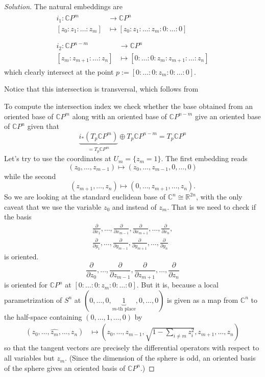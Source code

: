 \begin{proof}[Solution]\leavevmode
The natural embeddings are
\begin{align*}
\begin{aligned}i_1: \mathbb{C}P^m &\longrightarrow \mathbb{C}P^n \\
	[z_0:z_1:\ldots:z_m] &\longmapsto [z_0:z_1:\ldots:z_m:0:\ldots:0]
\end{aligned}
\\\\\begin{aligned}	i_2: \mathbb{C}P^{n-m} &\longrightarrow \mathbb{C}P^n \\
[z_{m}:z_{m+1}:\ldots:z_n] &\longmapsto [0:\ldots:0:z_{m}:z_{m+1}:\ldots:z_n] \end{aligned}\end{align*}
which clearly intersect at the point \(p:=[0:\ldots:0:z_m:0:\ldots:0]\).

Notice that this intersection is transversal, which follows from

To compute the intersection index we check whether the base obtained from an oriented base of \(\mathbb{C}P^{m}\) along with an oriented base of \(\mathbb{C}P^{n-m}\) give an oriented base of \(\mathbb{C}P^{n}\) given that
\[\underbrace{i_*(T_p \mathbb{C}P^{m})}_{=T_p\mathbb{C}P^m}\oplus T_p\mathbb{C}P^{n-m}=T_p\mathbb{C}P^{n}\]
Let's try to use the coordinates at \(U_m=\{z_m=1\}\). The first embedding reads
\[(z_0,\ldots,z_{m-1})\mapsto (z_0,\ldots,z_{m-1},0,\ldots,0)\]
while the second
\[(z_{m+1},\ldots,z_n)\mapsto (0,\ldots,z_{m+1},\ldots,z_n).\]
So we are looking at the standard euclidean base of \(\mathbb{C}^n\cong \mathbb{R}^{2n}\), with the only caveat that we use the variable \(z_0\) and instead of \(z_m\). That is we need to check if the basis
\begin{align*}
\frac{\partial }{\partial x_1},\ldots,\frac{\partial }{\partial x_{m-1}},\frac{\partial }{\partial x_{m+1}},\ldots,\frac{\partial }{\partial x_n},\\
\frac{\partial }{\partial y_1},\ldots,\frac{\partial }{\partial y_{m-1}},\frac{\partial }{\partial y_{m+1}},\ldots,\frac{\partial }{\partial y_n}
\end{align*}
is oriented.
\[\frac{\partial }{\partial z_0},\ldots,\frac{\partial }{\partial z_{m-1}},\frac{\partial }{\partial z_{m+1}},\ldots,\frac{\partial }{\partial z_n}\]
is oriented for \(\mathbb{C}P^{n}\) at \([0:\ldots:0:z_m:0:\ldots:0]\). But it is, because a local parametrization of \(S^{n}\) at \((0,\ldots,0,\underbrace{1}_{m\text{-th place} },0,\ldots,0)\) is given as a map from \(\mathbb{C}^n\) to the half-space containing \((0,\ldots,1,\ldots,0)\) by
\begin{align*}
	(z_0,\ldots,\widehat{z_m},\ldots,z_n) &\longmapsto \left(z_0,\ldots,z_{m-1},\sqrt{1-\sum_{i\neq m}z_i^2} ,z_{m+1},\ldots,z_n\right) 
\end{align*}
so that the tangent vectors are precisely the differential operators with respect to all variables but \(z_m\). (Since the dimension of the sphere is odd, an oriented basis of the sphere gives an oriented basis of  \(\mathbb{C}P^{n}\).)


\end{proof}
